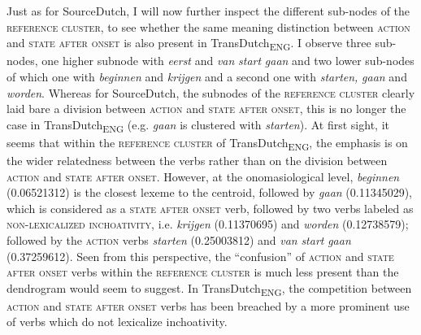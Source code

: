 Just as for SourceDutch, I will now further inspect the different sub-nodes of the \textsc{reference cluster}, to see whether the same meaning distinction between \textsc{action} and \textsc{state after onset} is also present in TransDutch\textsubscript{ENG}. I observe three sub-nodes, one higher subnode with \textit{eerst} and \textit{van} \textit{start} \textit{gaan} and two lower sub-nodes of which one with \textit{beginnen} and \textit{krijgen} and a second one with \textit{starten,} \textit{gaan} and \textit{worden}. Whereas for SourceDutch, the subnodes of the \textsc{reference cluster} clearly laid bare a division between \textsc{action} and \textsc{state after onset}, this is no longer the case in TransDutch\textsubscript{ENG} (e.g. \textit{gaan} is clustered with \textit{starten}). At first sight, it seems that within the \textsc{reference cluster} of TransDutch\textsubscript{ENG}, the emphasis is on the wider relatedness between the verbs rather than on the division between \textsc{action} and \textsc{state after onset}. However, at the onomasiological level, \textit{beginnen} (0.06521312) is the closest lexeme to the centroid, followed by \textit{gaan} (0.11345029), which is considered as a \textsc{state after onset} verb, followed by two verbs labeled as {\textsc{non-lexicalized inchoativity}}, i.e. \textit{krijgen} (0.11370695) and \textit{worden} (0.12738579); followed by the \textsc{action} verbs \textit{starten} (0.25003812) and \textit{van} \textit{start} \textit{gaan} (0.37259612). Seen from this perspective, the ``confusion'' of \textsc{action} and \textsc{state after onset} verbs within the \textsc{reference cluster} is much less present than the dendrogram would seem to suggest. In TransDutch\textsubscript{ENG}, the competition between \textsc{action} and \textsc{state after onset} verbs has been breached by a more prominent use of verbs which do not lexicalize inchoativity.

